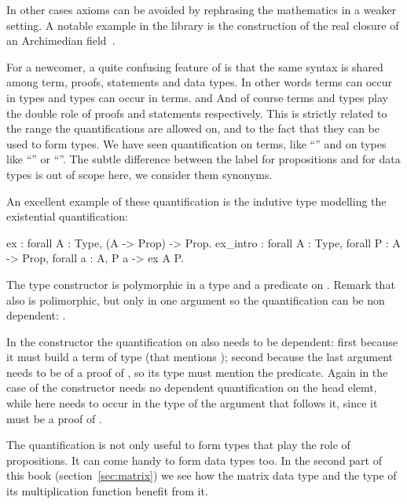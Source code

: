 In other cases axioms can be avoided by rephrasing the mathematics
in a weaker setting.  A notable example in the \mcbMC{} library
is the construction of the real closure of an Archimedian
field~\cite{DBLP:conf/itp/Cohen12}.



For a newcomer, a quite confusing feature of \mcbCIC{} is that the same syntax
is shared among term, proofs, statements and data types.  In other words terms
can occur in types and types can occur in terms.  and And of course terms and
types play the double role of proofs and statements respectively.
This is strictly related to the range the quantifications are allowed on,
and to the fact that they can be used to form types.
We have seen quantification on terms, like ``'' and on types
like ``'' or ``''.  The subtle difference
between the label  for propositions and  for data types
is out of scope here, we consider them synonyms.

An excellent example of these quantification is the indutive type
modelling the existential quantification:

\begin{coq}{}{}
ex : forall A : Type, (A -> Prop) -> Prop.
ex_intro : forall A : Type, forall P : A -> Prop, forall a : A, P a -> ex A P.
\end{coq}

The  type constructor is polymorphic in a type  and a predicate
on .  Remark that also  is polimorphic, but only in one argument
so the quantification can be non dependent: .

In the constructor  the quantification on  also needs to be
dependent: first because it must build a term of type  (that
mentions ); second because the last argument needs to be of a proof of
, so its type must mention the predicate.  Again in the case of 
the constructor  needs no dependent
quantification on the head elemt, while here  needs to occur in
the type of the argument that follows it, since it must be a proof of
.

The  quantification is not only useful to form types that
play the role of propositions.  It can come handy to form data types
too.  In the second part of this book (section~\ref{sec:matrix})
we see how the matrix data type
and the type of its multiplication function benefit from it.


